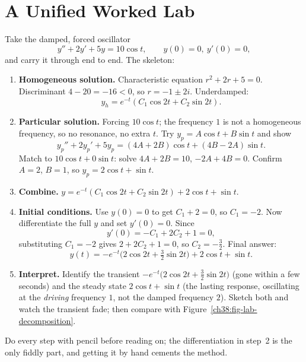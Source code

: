 \section{A Unified Worked Lab}
\label{ch38:lab}

\begin{labbox}
Take the damped, forced oscillator
\[
  y'' + 2y' + 5y = 10\cos t, \qquad y(0) = 0,\ y'(0) = 0,
\]
and carry it through end to end. The skeleton:
\begin{enumerate}
  \item \textbf{Homogeneous solution.} Characteristic equation $r^2 + 2r + 5 =
  0$. Discriminant $4 - 20 = -16 < 0$, so $r = -1 \pm 2i$. Underdamped:
  \[
    y_h = e^{-t}(C_1 \cos 2t + C_2 \sin 2t).
  \]
  \item \textbf{Particular solution.} Forcing $10\cos t$; the frequency $1$ is
  not a homogeneous frequency, so no resonance, no extra $t$. Try $y_p = A\cos t +
  B\sin t$ and show
  \[
    y_p'' + 2y_p' + 5y_p = (4A + 2B)\cos t + (4B - 2A)\sin t.
  \]
  Match to $10\cos t + 0\sin t$: solve $4A + 2B = 10$, $-2A + 4B = 0$. Confirm
  $A = 2$, $B = 1$, so $y_p = 2\cos t + \sin t$.
  \item \textbf{Combine.} $y = e^{-t}(C_1\cos 2t + C_2\sin 2t) + 2\cos t + \sin t$.
  \item \textbf{Initial conditions.} Use $y(0)=0$ to get $C_1 + 2 = 0$, so $C_1 =
  -2$. Now differentiate the full $y$ and set $y'(0) = 0$. Since
  \[
    y'(0) = -C_1 + 2C_2 + 1 = 0,
  \]
  substituting $C_1 = -2$ gives $2 + 2C_2 + 1 = 0$, so $C_2 = -\tfrac32$. Final
  answer:
  \[
    y(t) = -e^{-t}\big(2\cos 2t + \tfrac32 \sin 2t\big) + 2\cos t + \sin t.
  \]
  \item \textbf{Interpret.} Identify the transient $-e^{-t}\big(2\cos 2t +
  \tfrac32\sin 2t\big)$ (gone within a few seconds) and the steady state $2\cos t
  + \sin t$ (the lasting response,
  oscillating at the \emph{driving} frequency $1$, not the damped frequency
  $2$). Sketch both and watch the transient fade; then compare with
  Figure~\ref{ch38:fig-lab-decomposition}.
\end{enumerate}
Do every step with pencil before reading on; the differentiation in step~2 is the
only fiddly part, and getting it by hand cements the method.
\end{labbox}

